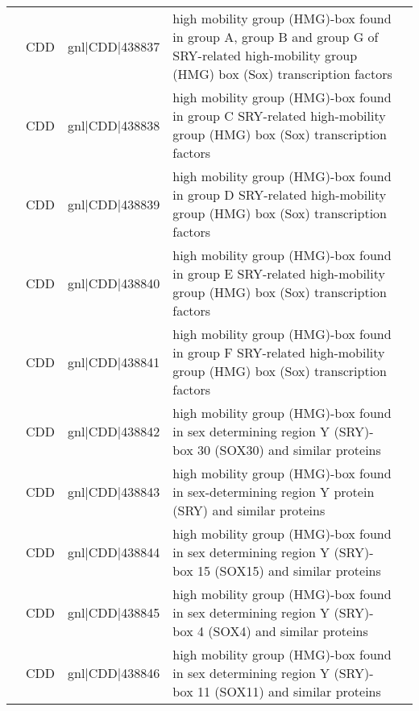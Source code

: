 \documentclass[../main.tex]{subfiles}
\begin{document}
\begin{landscape}
\begin{longtable}{@{}cllll@{}}
		                                & CDD                  & gnl|CDD|438837  & high mobility group (HMG)-box found in group A, group B and group G of SRY-related high-mobility group (HMG) box (Sox) transcription factors & \\
		                                & CDD                  & gnl|CDD|438838  & high mobility group (HMG)-box found in group C SRY-related high-mobility group (HMG) box (Sox) transcription factors                         & \\
		                                & CDD                  & gnl|CDD|438839  & high mobility group (HMG)-box found in group D SRY-related high-mobility group (HMG) box (Sox) transcription factors                         & \\
		                                & CDD                  & gnl|CDD|438840  & high mobility group (HMG)-box found in group E SRY-related high-mobility group (HMG) box (Sox) transcription factors                         & \\
		                                & CDD                  & gnl|CDD|438841  & high mobility group (HMG)-box found in group F SRY-related high-mobility group (HMG) box (Sox) transcription factors                         & \\
		                                & CDD                  & gnl|CDD|438842  & high mobility group (HMG)-box found in sex determining region Y (SRY)-box 30 (SOX30) and similar proteins                                    & \\
		                                & CDD                  & gnl|CDD|438843  & high mobility group (HMG)-box found in sex-determining region Y protein (SRY) and similar proteins                                           & \\
		                                & CDD                  & gnl|CDD|438844  & high mobility group (HMG)-box found in sex determining region Y (SRY)-box 15 (SOX15) and similar proteins                                    & \\
		                                & CDD                  & gnl|CDD|438845  & high mobility group (HMG)-box found in sex determining region Y (SRY)-box 4 (SOX4) and similar proteins                                      & \\
		                                & CDD                  & gnl|CDD|438846  & high mobility group (HMG)-box found in sex determining region Y (SRY)-box 11 (SOX11) and similar proteins                                    & \\

\end{longtable}
\end{landscape}
\end{document}
